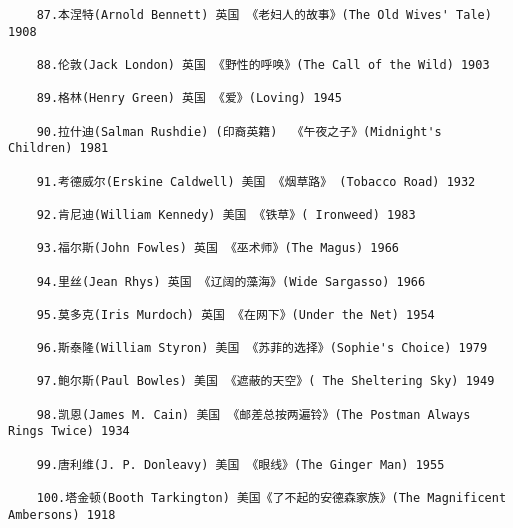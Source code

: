 \documentclass[UTF8]{../../RepresentationUniverse}
\begin{document}
\begin{lstlisting}
    87.本涅特(Arnold Bennett) 英国 《老妇人的故事》(The Old Wives' Tale) 1908
    
    88.伦敦(Jack London) 英国 《野性的呼唤》(The Call of the Wild) 1903
    
    89.格林(Henry Green) 英国 《爱》(Loving) 1945
    
    90.拉什迪(Salman Rushdie) (印裔英籍)  《午夜之子》(Midnight's Children) 1981
    
    91.考德威尔(Erskine Caldwell) 美国 《烟草路》 (Tobacco Road) 1932
    
    92.肯尼迪(William Kennedy) 美国 《铁草》( Ironweed) 1983
    
    93.福尔斯(John Fowles) 英国 《巫术师》(The Magus) 1966
    
    94.里丝(Jean Rhys) 英国 《辽阔的藻海》(Wide Sargasso) 1966
    
    95.莫多克(Iris Murdoch) 英国 《在网下》(Under the Net) 1954
    
    96.斯泰隆(William Styron) 美国 《苏菲的选择》(Sophie's Choice) 1979
    
    97.鲍尔斯(Paul Bowles) 美国 《遮蔽的天空》( The Sheltering Sky) 1949
    
    98.凯恩(James M. Cain) 美国 《邮差总按两遍铃》(The Postman Always Rings Twice) 1934
    
    99.唐利维(J. P. Donleavy) 美国 《眼线》(The Ginger Man) 1955
    
    100.塔金顿(Booth Tarkington) 美国《了不起的安德森家族》(The Magnificent Ambersons) 1918
\end{lstlisting}
\end{document}
